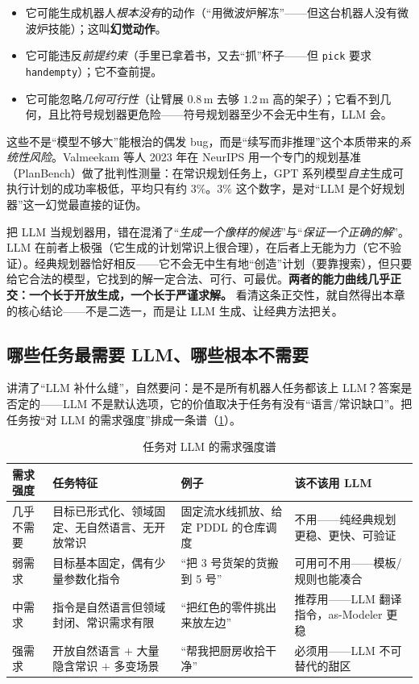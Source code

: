 \begin{itemize}
  \item 它可能生成机器人\emph{根本没有}的动作（“用微波炉解冻”——但这台机器人没有微波炉技能）；这叫\textbf{幻觉动作}。
  \item 它可能违反\emph{前提约束}（手里已拿着书，又去“抓”杯子——但 \texttt{pick} 要求 \texttt{handempty}）；它不查前提。
  \item 它可能忽略\emph{几何可行性}（让臂展 $0.8\,$m 去够 $1.2\,$m 高的架子）；它看不到几何，且比符号规划器更危险——符号规划器至少不会无中生有，LLM 会。
\end{itemize}

\noindent 这些不是“模型不够大”能根治的偶发 bug，而是“续写而非推理”这个本质带来的\emph{系统性风险}。Valmeekam 等人 2023 年在 NeurIPS 用一个专门的规划基准（PlanBench）做了批判性测量：在常识规划任务上，GPT 系列模型\emph{自主}生成可执行计划的成功率极低，平均只有约 $3\%$\cite{valmeekam2023planbench}。$3\%$ 这个数字，是对“LLM 是个好规划器”这一幻觉最直接的证伪。

\begin{insight}
把 LLM 当规划器用，错在混淆了“\emph{生成一个像样的候选}”与“\emph{保证一个正确的解}”。LLM 在前者上极强（它生成的计划常识上很合理），在后者上无能为力（它不验证）。经典规划器恰好相反——它不会无中生有地“创造”计划（要靠搜索），但只要给它合法的模型，它找到的解一定合法、可行、可最优。\textbf{两者的能力曲线几乎正交：一个长于开放生成，一个长于严谨求解。} 看清这条正交性，就自然得出本章的核心结论——不是二选一，而是让 LLM 生成、让经典方法把关。
\end{insight}

\subsection{哪些任务最需要 LLM、哪些根本不需要}
\label{sec:llm-when}

讲清了“LLM 补什么缝”，自然要问：是不是所有机器人任务都该上 LLM？答案是否定的——LLM 不是默认选项，它的价值取决于任务有没有“语言/常识缺口”。把任务按“对 LLM 的需求强度”排成一条谱（\cref{tab:llm-demand}）。

\begin{table}[H]\centering\small
\caption{任务对 LLM 的需求强度谱}
\label{tab:llm-demand}
\begin{tabular}{p{2.0cm}p{4.2cm}p{3.6cm}p{3.2cm}}
\toprule
需求强度 & 任务特征 & 例子 & 该不该用 LLM \\
\midrule
几乎不需要 & 目标已形式化、领域固定、无自然语言、无开放常识 & 固定流水线抓放、给定 PDDL 的仓库调度 & 不用——纯经典规划更稳、更快、可验证 \\
弱需求 & 目标基本固定，偶有少量参数化指令 & “把 3 号货架的货搬到 5 号” & 可用可不用——模板/规则也能凑合 \\
中需求 & 指令是自然语言但领域封闭、常识需求有限 & “把红色的零件挑出来放左边” & 推荐用——LLM 翻译指令，as-Modeler 更稳 \\
强需求 & 开放自然语言 $+$ 大量隐含常识 $+$ 多变场景 & “帮我把厨房收拾干净” & 必须用——LLM 不可替代的甜区 \\
\bottomrule
\end{tabular}
\end{table}

